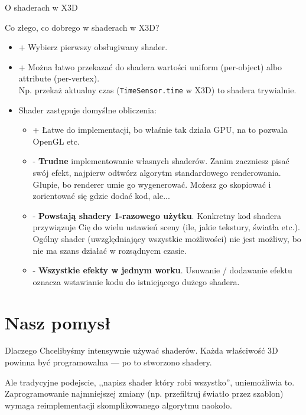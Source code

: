 \documentclass{beamer}
\begin{document}
\begin{frame}{O shaderach w X3D}

Co złego, co dobrego w shaderach w X3D?

\begin{itemize}
  \item + Wybierz pierwszy obsługiwany shader.
  \item + Można łatwo przekazać do shadera wartości uniform (per-object)
    albo attribute (per-vertex).\\
    Np. przekaż aktualny czas (\texttt{TimeSensor.time} w X3D) to shadera trywialnie.
  \item Shader zastępuje domyślne obliczenia:
    \begin{itemize}
      \item + Łatwe do implementacji, bo właśnie tak działa GPU, na to pozwala
        OpenGL etc.
      \item - \textbf{Trudne} implementowanie własnych shaderów.
        Zanim zaczniesz pisać swój efekt, najpierw odtwórz algorytm
        standardowego renderowania. Głupie, bo renderer umie go wygenerować.
        Możesz go skopiować i zorientować się gdzie dodać kod, ale...
      \item - \textbf{Powstają shadery 1-razowego użytku}.
        Konkretny kod shadera przywiązuje Cię do wielu ustawień sceny
        (ile, jakie tekstury, światła etc.).
        Ogólny shader (uwzględniający wszystkie możliwości) nie jest możliwy,
        bo nie ma szans działać w rozsądnycm czasie.
      \item - \textbf{Wszystkie efekty w jednym worku}.
        Usuwanie / dodawanie efektu oznacza wstawianie kodu do istniejącego
        dużego shadera.
    \end{itemize}
\end{itemize}
\end{frame}

\section{Nasz pomysł}

\begin{frame}{Dlaczego}
Chcelibyśmy intensywnie używać shaderów. Każda właściwość 3D powinna
być programowalna --- po to stworzono shadery.

Ale tradycyjne podejscie, ,,napisz shader który robi wszystko'',
uniemożliwia to. Zaprogramowanie najmniejszej zmiany (np. przefiltruj
światło przez szablon) wymaga reimplementacji skomplikowanego algorytmu naokoło.
\end{frame}
\end{document}
